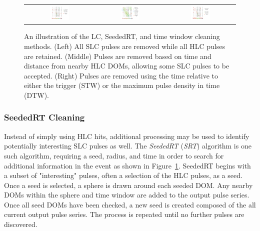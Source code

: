 \begin{figure}[h]
\centering
\begin{tabular}{ccc}
\includegraphics[width=0.3\textwidth]{LCCleaningDiagram.pdf}  &
\includegraphics[width=0.3\textwidth]{SRTCleaningDiagram.pdf} & 
\includegraphics[width=0.3\textwidth]{TWCleaningDiagram.pdf}   	\\
\end{tabular}	
\caption{An illustration of the LC, SeededRT, and time window cleaning methods. (Left) All SLC pulses are removed while all HLC pulses are retained. (Middle) Pulses are removed based on time and distance from nearby HLC DOMs, allowing some SLC pulses to be accepted. (Right) Pulses are removed using the time relative to either the trigger (STW) or the maximum pulse density in time (DTW). }
\label{fig:hit_cleaning}
\end{figure}

\subsubsection{SeededRT Cleaning}
Instead of simply using HLC hits, additional processing may be used to identify potentially interesting SLC pulses as well.
The \emph{SeededRT} (\emph{SRT}) algorithm is one such algorithm, requiring a seed, radius, and time in order to search for additional information in the event as shown in Figure~\ref{fig:hit_cleaning}.
SeededRT begins with a subset of "interesting" pulses, often a selection of the HLC pulses, as a seed.
Once a seed is selected, a sphere is drawn around each seeded DOM. 
Any nearby DOMs within the sphere and time window are added to the output pulse series.
Once all seed DOMs have been checked, a new seed is created composed of the all current output pulse series.
The process is repeated until no further pulses are discovered.

